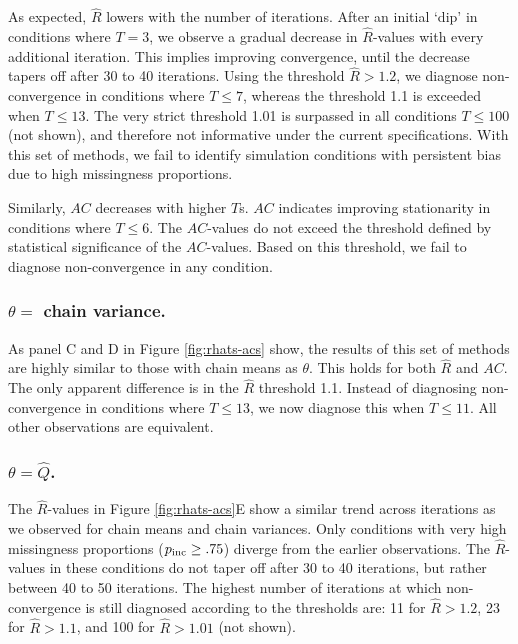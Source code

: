 \documentclass[Royal,times,sageh]{sagej}
\begin{document}
As expected, \(\widehat{R}\) lowers with the number of iterations. After an initial `dip' in conditions where \(T=3\), we observe a gradual decrease in \(\widehat{R}\)-values with every additional iteration. This implies improving convergence, until the decrease tapers off after 30 to 40 iterations. Using the threshold \(\widehat{R}>1.2\), we diagnose non-convergence in conditions where \(T\leq7\), whereas the threshold 1.1 is exceeded when \(T\leq13\). The very strict threshold 1.01 is surpassed in all conditions \(T\leq100\) (not shown), and therefore not informative under the current specifications. With this set of methods, we fail to identify simulation conditions with persistent bias due to high missingness proportions.

Similarly, \(AC\) decreases with higher \(T\)s. \(AC\) indicates improving stationarity in conditions where \(T\leq6\). The \(AC\)-values do not exceed the threshold defined by statistical significance of the \(AC\)-values. Based on this threshold, we fail to diagnose non-convergence in any condition.

\hypertarget{theta-chain-variance.}{%
\subsubsection{\texorpdfstring{\(\theta=\) chain variance.}{\textbackslash theta= chain variance.}}\label{theta-chain-variance.}}

As panel C and D in Figure \ref{fig:rhats-acs} show, the results of this set of methods are highly similar to those with chain means as \(\theta\). This holds for both \(\widehat{R}\) and \(AC\). The only apparent difference is in the \(\widehat{R}\) threshold 1.1. Instead of diagnosing non-convergence in conditions where \(T\leq13\), we now diagnose this when \(T\leq11\). All other observations are equivalent.

\hypertarget{thetahatq.}{%
\subsubsection{\texorpdfstring{\(\theta=\hat{Q}\).}{\textbackslash theta=\textbackslash hat\{Q\}.}}\label{thetahatq.}}

The \(\widehat{R}\)-values in Figure \ref{fig:rhats-acs}E show a similar trend across iterations as we observed for chain means and chain variances. Only conditions with very high missingness proportions (\(p_{\rm inc}\geq.75\)) diverge from the earlier observations. The \(\widehat{R}\)-values in these conditions do not taper off after 30 to 40 iterations, but rather between 40 to 50 iterations. The highest number of iterations at which non-convergence is still diagnosed according to the thresholds are: 11 for \(\widehat{R}>1.2\), 23 for \(\widehat{R}>1.1\), and 100 for \(\widehat{R}>1.01\) (not shown).
\end{document}
